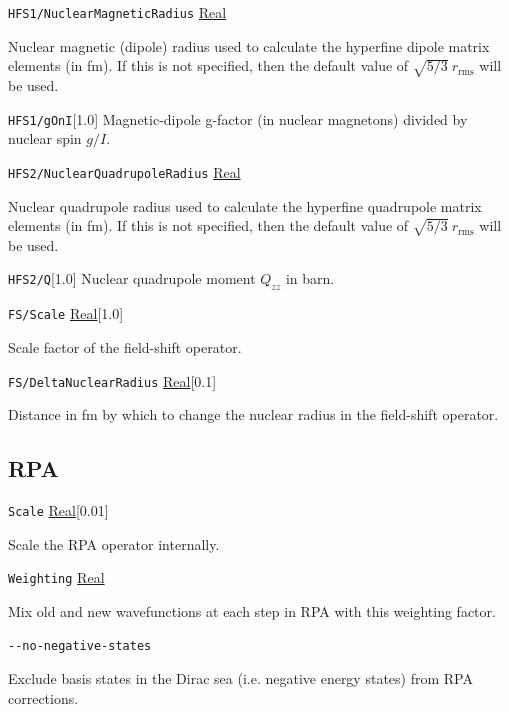 \documentclass{report}
\begin{document}
\texttt{HFS1/NuclearMagneticRadius} \uline{Real}
\begin{adjustwidth}{1cm}{}
Nuclear magnetic (dipole) radius used to calculate the hyperfine dipole matrix elements (in fm). If this is not
specified, then the default value of $\sqrt{5/3} ~ r_{\textrm{rms}}$ will be used.
\end{adjustwidth}

\texttt{HFS1/gOnI}[1.0]
Magnetic-dipole g-factor (in nuclear magnetons) divided by nuclear spin $g/I$.

\texttt{HFS2/NuclearQuadrupoleRadius} \uline{Real}
\begin{adjustwidth}{1cm}{}
Nuclear quadrupole radius used to calculate the hyperfine quadrupole matrix elements (in fm). If this is not
specified, then the default value of $\sqrt{5/3} ~ r_{\textrm{rms}}$ will be used.
\end{adjustwidth}

\texttt{HFS2/Q}[1.0]
Nuclear quadrupole moment $Q_{zz}$ in barn.

\texttt{FS/Scale} \uline{Real}[1.0]
\begin{adjustwidth}{1cm}{}
Scale factor of the field-shift operator.
\end{adjustwidth}

\texttt{FS/DeltaNuclearRadius} \uline{Real}[0.1]
\begin{adjustwidth}{1cm}{}
Distance in fm by which to change the nuclear radius in the field-shift operator. 
\end{adjustwidth}

\subsection{RPA}

\texttt{Scale} \uline{Real}[0.01]
\begin{adjustwidth}{1cm}{}
Scale the RPA operator internally.
\end{adjustwidth}

\texttt{Weighting} \uline{Real}
\begin{adjustwidth}{1cm}{}
Mix old and new wavefunctions at each step in RPA with this weighting factor.
\end{adjustwidth}

\texttt{{-}{-}no-negative-states}
\begin{adjustwidth}{1cm}{}
Exclude basis states in the Dirac sea (i.e. negative energy states) from RPA corrections.
\end{adjustwidth}
\end{document}
